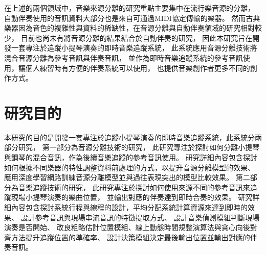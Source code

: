 \documentclass[class=NCU_thesis, crop=false]{standalone}
\begin{document}
在上述的兩個領域中，音樂來源分離的研究重點主要集中在流行樂音源的分離，
自動伴奏使用的音訊資料大部分也是來自可通過MIDI協定傳輸的樂器。
然而古典樂器因為音色的複雜性與資料的稀缺性，在音源分離與自動伴奏領域的研究相對較少，
目前也尚未有將音源分離的結果結合於自動伴奏的研究，
因此本研究旨在開發一套專注於追蹤小提琴演奏的即時音樂追蹤系統，
此系統應用音源分離技術將混合音源分離為參考音訊與伴奏音訊，
並作為即時音樂追蹤系統的參考音訊使用，讓個人練習時有方便的伴奏系統可以使用，
也提供音樂創作者更多不同的創作方式。

\pagebreak

\section{研究目的}

本研究的目的是開發一套專注於追蹤小提琴演奏的即時音樂追蹤系統，此系統分兩部分研究，
第一部分為音源分離技術的研究，
此研究專注於探討如何分離小提琴與鋼琴的混合音訊，作為後續音樂追蹤的參考音訊使用。
研究詳細內容包含探討如何根據不同樂器的特性調整資料前處理的方式，以提升音源分離模型的效果、
應用深度學習網路訓練音源分離模型並與過往表現突出的模型比較效果。
第二部分為音樂追蹤技術的研究，
此研究專注於探討如何使用來源不同的參考音訊來追蹤現場小提琴演奏的樂曲位置，
並輸出對應的伴奏達到即時合奏的效果。
研究詳細內容包含探討系統行程與線程的設計，平均分配系統計算資源來達到即時的效果、
設計參考音訊與現場串流音訊的特徵提取方式、
設計音樂偵測模組判斷現場演奏是否開始、
改良粗略估計位置模組、線上動態時間規整演算法與貪心向後對齊方法提升追蹤位置的準確率、
設計決策模組決定最後輸出位置並輸出對應的伴奏音訊。
\end{document}
